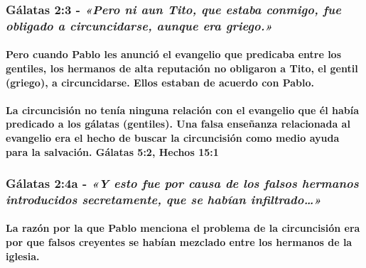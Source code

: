 \documentclass[11a pt,twoside]{article}
\newcommand{\scripture}[1]{%
  {\fontsize{12pt}{16pt}\selectfont\ScriptureFont\itshape #1}%
}
\let\oldsubsubsection\subsubsection
\renewcommand{\subsubsection}{\needspace{4\baselineskip}\oldsubsubsection}
\let\oldparagraph\paragraph
\renewcommand{\paragraph}{\needspace{3\baselineskip}\oldparagraph}
\begin{document}
\subsubsection{\texorpdfstring{Gálatas 2:3 -
\scripture{«Pero ni aun Tito, que estaba conmigo, fue obligado a circuncidarse, aunque era griego.»}}{Gálatas 2:3 - }}\label{guxe1latas-23---pero-ni-aun-tito-que-estaba-conmigo-fue-obligado-a-circuncidarse-aunque-era-griego.}

\paragraph{Pero cuando Pablo les anunció el evangelio que predicaba
entre los gentiles, los hermanos de alta reputación no obligaron a Tito,
el gentil (griego), a circuncidarse. Ellos estaban de acuerdo con
Pablo.}\label{pero-cuando-pablo-les-anunciuxf3-el-evangelio-que-predicaba-entre-los-gentiles-los-hermanos-de-alta-reputaciuxf3n-no-obligaron-a-tito-el-gentil-griego-a-circuncidarse.-ellos-estaban-de-acuerdo-con-pablo.}

\paragraph{La circuncisión no tenía ninguna relación con el evangelio
que él había predicado a los gálatas (gentiles). Una falsa enseñanza
relacionada al evangelio era el hecho de buscar la circuncisión como
medio ayuda para la salvación. Gálatas 5:2, Hechos
15:1}\label{la-circuncisiuxf3n-no-tenuxeda-ninguna-relaciuxf3n-con-el-evangelio-que-uxe9l-habuxeda-predicado-a-los-guxe1latas-gentiles.-una-falsa-enseuxf1anza-relacionada-al-evangelio-era-el-hecho-de-buscar-la-circuncisiuxf3n-como-medio-ayuda-para-la-salvaciuxf3n.-guxe1latas-52-hechos-151}

\subsubsection{\texorpdfstring{Gálatas 2:4a -
\scripture{«Y esto fue por causa de los falsos hermanos introducidos secretamente, que se habían infiltrado…»}}{Gálatas 2:4a - }}\label{guxe1latas-24a---y-esto-fue-por-causa-de-los-falsos-hermanos-introducidos-secretamente-que-se-habuxedan-infiltrado}

\paragraph{La razón por la que Pablo menciona el problema de la
circuncisión era por que falsos creyentes se habían mezclado entre los
hermanos de la
iglesia.}\label{la-razuxf3n-por-la-que-pablo-menciona-el-problema-de-la-circuncisiuxf3n-era-por-que-falsos-creyentes-se-habuxedan-mezclado-entre-los-hermanos-de-la-iglesia.}
\end{document}
